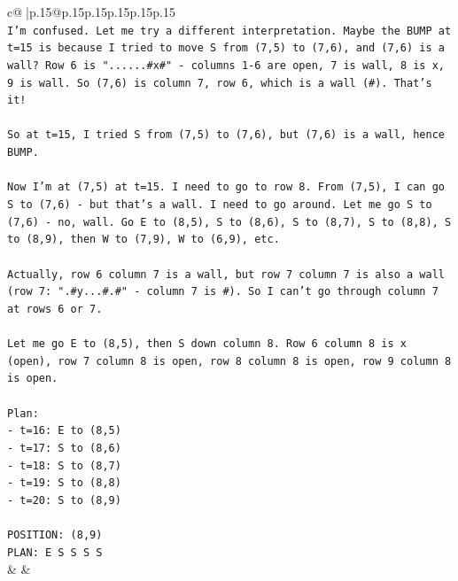 \documentclass{article}
\begin{document}
{\begin{supertabular}{c@{$\;$}|p{.15\linewidth}@{}p{.15\linewidth}p{.15\linewidth}p{.15\linewidth}p{.15\linewidth}p{.15\linewidth}}
{{{\\ 
\texttt{I'm confused. Let me try a different interpretation. Maybe the BUMP at t=15 is because I tried to move S from (7,5) to (7,6), and (7,6) is a wall? Row 6 is "......\#x\#" {-} columns 1{-}6 are open, 7 is wall, 8 is x, 9 is wall. So (7,6) is column 7, row 6, which is a wall (\#). That's it!} \\
\\ 
\texttt{So at t=15, I tried S from (7,5) to (7,6), but (7,6) is a wall, hence BUMP.} \\
\\ 
\texttt{Now I'm at (7,5) at t=15. I need to go to row 8. From (7,5), I can go S to (7,6) {-} but that's a wall. I need to go around. Let me go S to (7,6) {-} no, wall. Go E to (8,5), S to (8,6), S to (8,7), S to (8,8), S to (8,9), then W to (7,9), W to (6,9), etc.} \\
\\ 
\texttt{Actually, row 6 column 7 is a wall, but row 7 column 7 is also a wall (row 7: ".\#y...\#.\#" {-} column 7 is \#). So I can't go through column 7 at rows 6 or 7.} \\
\\ 
\texttt{Let me go E to (8,5), then S down column 8. Row 6 column 8 is x (open), row 7 column 8 is open, row 8 column 8 is open, row 9 column 8 is open.} \\
\\ 
\texttt{Plan:} \\
\texttt{{-} t=16: E to (8,5)} \\
\texttt{{-} t=17: S to (8,6)} \\
\texttt{{-} t=18: S to (8,7)} \\
\texttt{{-} t=19: S to (8,8)} \\
\texttt{{-} t=20: S to (8,9)} \\
\\ 
\texttt{POSITION: (8,9)} \\
\texttt{PLAN: E S S S S} \\
            }
        }
    }
    & & \\ \\


\end{supertabular}}
\end{document}
